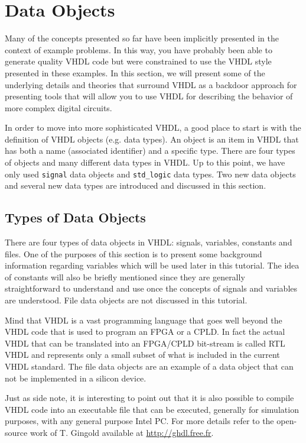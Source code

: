 %
%
%
\chapter{Data Objects}

Many of the concepts presented so far have been implicitly presented in the context of example problems. In this way, you have probably been able to generate quality VHDL code but were constrained to use the VHDL style presented in these examples. In this section, we will present some of the underlying details and theories that surround VHDL as a backdoor approach for presenting tools that will allow you to use VHDL for describing the behavior of more complex digital circuits.

In order to move into more sophisticated VHDL, a good place to start is with the definition of VHDL objects (e.g. data types). An object is an item in VHDL that has both a name (associated identifier) and a specific type. There are four types of objects and many different data types in VHDL. Up to this point, we have only used \texttt{signal} data objects and \texttt{std\_logic} data types. Two new data objects and several new data types are introduced and discussed in this section.

\section{Types of Data Objects}
There are four types of data objects in VHDL: signals, variables, constants and files. One of the purposes of this section is to present some background information regarding variables which will be used later in this tutorial. The idea of constants will also be briefly mentioned since they are generally straightforward to understand and use once the concepts of signals and variables are understood. File data objects are not discussed in this tutorial. 

Mind that VHDL is a vast programming language that goes well beyond the VHDL code that is used to program an FPGA or a CPLD. In fact the actual VHDL that can be translated into an FPGA/CPLD bit-stream is called RTL VHDL and represents only a small subset of what is included in the current VHDL standard. The file  data objects are an example of a data object that can not be implemented in a silicon device.

Just as side note, it is interesting to point out that it is also possible to compile VHDL code into an executable file that can be executed, generally for simulation purposes, with any general purpose Intel PC. For more details refer to the open-source work of T. Gingold available at \url{http://ghdl.free.fr}.

